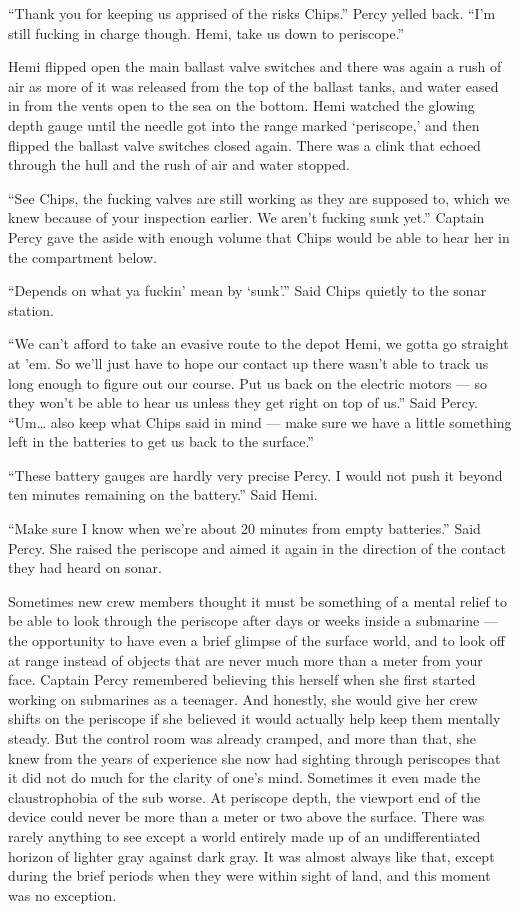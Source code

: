 \documentclass[
]{scrbook}
\begin{document}
``Thank you for keeping us apprised of the risks Chips.'' Percy yelled
back. ``I'm still fucking in charge though. Hemi, take us down to
periscope.''

Hemi flipped open the main ballast valve switches and there was again a
rush of air as more of it was released from the top of the ballast
tanks, and water eased in from the vents open to the sea on the bottom.
Hemi watched the glowing depth gauge until the needle got into the range
marked `periscope,' and then flipped the ballast valve switches closed
again. There was a clink that echoed through the hull and the rush of
air and water stopped.

``See Chips, the fucking valves are still working as they are supposed
to, which we knew because of your inspection earlier. We aren't fucking
sunk yet.'' Captain Percy gave the aside with enough volume that Chips
would be able to hear her in the compartment below.

``Depends on what ya fuckin' mean by `sunk'.'' Said Chips quietly to the
sonar station.

``We can't afford to take an evasive route to the depot Hemi, we gotta
go straight at 'em. So we'll just have to hope our contact up there
wasn't able to track us long enough to figure out our course. Put us
back on the electric motors --- so they won't be able to hear us unless
they get right on top of us.'' Said Percy. ``Um\ldots{} also keep what
Chips said in mind --- make sure we have a little something left in the
batteries to get us back to the surface.''

``These battery gauges are hardly very precise Percy. I would not push
it beyond ten minutes remaining on the battery.'' Said Hemi.

``Make sure I know when we're about 20 minutes from empty batteries.''
Said Percy. She raised the periscope and aimed it again in the direction
of the contact they had heard on sonar.

Sometimes new crew members thought it must be something of a mental
relief to be able to look through the periscope after days or weeks
inside a submarine --- the opportunity to have even a brief glimpse of
the surface world, and to look off at range instead of objects that are
never much more than a meter from your face. Captain Percy remembered
believing this herself when she first started working on submarines as a
teenager. And honestly, she would give her crew shifts on the periscope
if she believed it would actually help keep them mentally steady. But
the control room was already cramped, and more than that, she knew from
the years of experience she now had sighting through periscopes that it
did not do much for the clarity of one's mind. Sometimes it even made
the claustrophobia of the sub worse. At periscope depth, the viewport
end of the device could never be more than a meter or two above the
surface. There was rarely anything to see except a world entirely made
up of an undifferentiated horizon of lighter gray against dark gray. It
was almost always like that, except during the brief periods when they
were within sight of land, and this moment was no exception.
\end{document}
